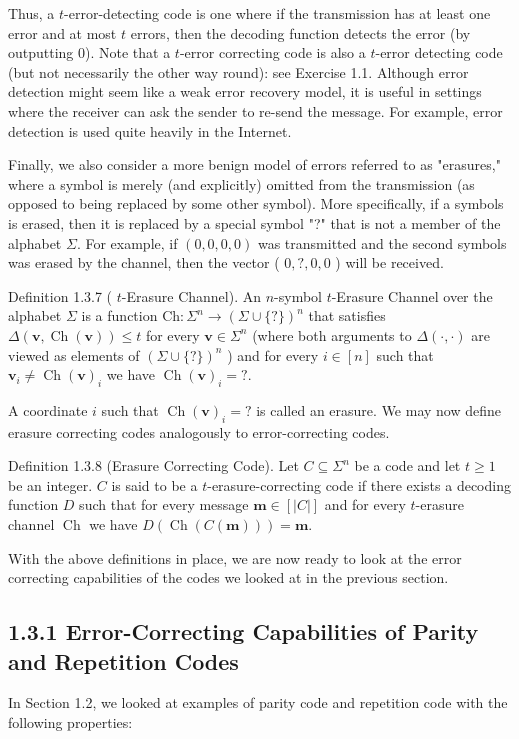 \documentclass[10pt]{article}
\begin{document}
Thus, a $t$-error-detecting code is one where if the transmission has at least one error and at most $t$ errors, then the decoding function detects the error (by outputting 0). Note that a $t$-error correcting code is also a $t$-error detecting code (but not necessarily the other way round): see Exercise 1.1. Although error detection might seem like a weak error recovery model, it is useful in settings where the receiver can ask the sender to re-send the message. For example, error detection is used quite heavily in the Internet.

Finally, we also consider a more benign model of errors referred to as "erasures," where a symbol is merely (and explicitly) omitted from the transmission (as opposed to being replaced by some other symbol). More specifically, if a symbols is erased, then it is replaced by a special symbol "?" that is not a member of the alphabet $\Sigma$. For example, if $(0,0,0,0)$ was transmitted and the second symbols was erased by the channel, then the vector ( $0, ?, 0,0$ ) will be received.

Definition 1.3.7 ( $t$-Erasure Channel). An $n$-symbol $t$-Erasure Channel over the alphabet $\Sigma$ is a function $\mathrm{Ch}: \Sigma^{n} \rightarrow(\Sigma \cup\{?\})^{n}$ that satisfies $\Delta(\mathbf{v}, \operatorname{Ch}(\mathbf{v})) \leq t$ for every $\mathbf{v} \in \Sigma^{n}$ (where both arguments to $\Delta(\cdot, \cdot)$ are viewed as elements of $(\Sigma \cup\{?\})^{n}$ ) and for every $i \in[n]$ such that $\mathbf{v}_{i} \neq \operatorname{Ch}(\mathbf{v})_{i}$ we have $\operatorname{Ch}(\mathbf{v})_{i}=?$.

A coordinate $i$ such that $\operatorname{Ch}(\mathbf{v})_{i}=?$ is called an erasure. We may now define erasure correcting codes analogously to error-correcting codes.

Definition 1.3.8 (Erasure Correcting Code). Let $C \subseteq \Sigma^{n}$ be a code and let $t \geq 1$ be an integer. $C$ is said to be a $t$-erasure-correcting code if there exists a decoding function $D$ such that for every message $\mathbf{m} \in[|C|]$ and for every $t$-erasure channel $\operatorname{Ch}$ we have $D(\operatorname{Ch}(C(\mathbf{m})))=\mathbf{m}$.

With the above definitions in place, we are now ready to look at the error correcting capabilities of the codes we looked at in the previous section.

\subsection*{1.3.1 Error-Correcting Capabilities of Parity and Repetition Codes}
In Section 1.2, we looked at examples of parity code and repetition code with the following properties:
\end{document}
